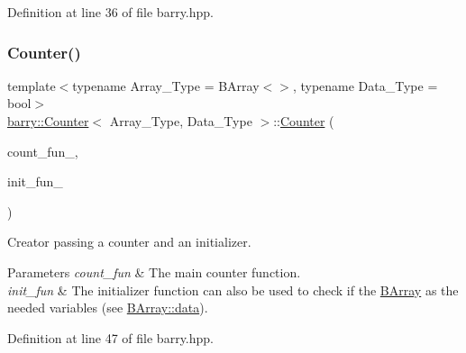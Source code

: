 Definition at line 36 of file barry.\+hpp.

\mbox{\label{classbarry_1_1_counter_a19668015222fd41f127e961c17f7a609}} 
\subsubsection{\texorpdfstring{Counter()}{Counter()}\hspace{0.1cm}{\footnotesize\ttfamily [3/3]}}
{\footnotesize\ttfamily template$<$typename Array\+\_\+\+Type  = B\+Array$<$$>$, typename Data\+\_\+\+Type  = bool$>$ \\
\hyperlink{classbarry_1_1_counter}{barry\+::\+Counter}$<$ Array\+\_\+\+Type, Data\+\_\+\+Type $>$\+::\hyperlink{classbarry_1_1_counter}{Counter} (\begin{DoxyParamCaption}\item[{\hyperlink{namespacebarry_abaaae3200da8e4b7faac3c04fe9c3081}{Counter\+\_\+fun\+\_\+type}$<$ Array\+\_\+\+Type, Data\+\_\+\+Type $>$}]{count\+\_\+fun\+\_\+,  }\item[{\hyperlink{namespacebarry_abaaae3200da8e4b7faac3c04fe9c3081}{Counter\+\_\+fun\+\_\+type}$<$ Array\+\_\+\+Type, Data\+\_\+\+Type $>$}]{init\+\_\+fun\+\_\+ }\end{DoxyParamCaption})\hspace{0.3cm}{\ttfamily [inline]}}



Creator passing a counter and an initializer. 


\begin{DoxyParams}{Parameters}
{\em count\+\_\+fun} & The main counter function. \\
\hline
{\em init\+\_\+fun} & The initializer function can also be used to check if the {\ttfamily \hyperlink{classbarry_1_1_b_array}{B\+Array}} as the needed variables (see \hyperlink{class_b_array_a9576163b52124021575e50dbcca2f6b9}{B\+Array\+::data}). \\
\hline
\end{DoxyParams}


Definition at line 47 of file barry.\+hpp.

\mbox{\label{classbarry_1_1_counter_ad899c3d55bb15e76ed7df05006e88b38}} 
